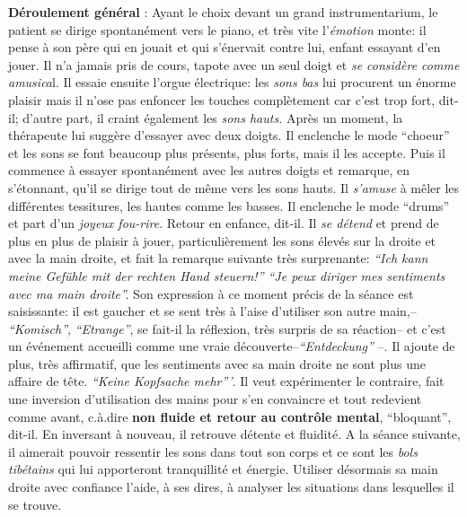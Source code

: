      	 \textbf{Déroulement général} :
    Ayant le choix devant un grand instrumentarium,
            le patient se dirige spontanément vers le piano, et très vite
            l'\textit{émotion} monte: il pense à son père qui en jouait et qui
            s'énervait contre lui, enfant essayant d'en
            jouer. Il n'a jamais pris de cours, tapote avec un seul doigt et \textit{se considère comme
            amusica}l. Il essaie ensuite l'orgue électrique: les \textit{sons bas}
            lui procurent un énorme plaisir mais il n'ose pas enfoncer les touches
            complètement car c'est trop fort, dit-il; d'autre part, il
            craint également les
            \textit{sons hauts.}
            Après un moment, la thérapeute lui suggère d'essayer avec deux doigts.
            Il enclenche le mode ``choeur'' et les sons se font beaucoup
            plus présents, plus forts, mais il les accepte. Puis il commence à essayer spontanément
            avec les autres doigts et remarque,  en s'étonnant, qu'il se
            dirige tout de même vers les sons
            hauts. Il \textit{s'amuse} à mêler les différentes tessitures,
            les hautes comme les basses.
            Il enclenche le mode ``drums'' et part d'un\textit{ joyeux
            fou-rire}. Retour en enfance, dit-il.
            Il \textit{se détend} et prend de plus en plus de plaisir à jouer, particulièrement  les sons élevés
            sur la droite et avec la main droite, et fait
            la remarque suivante très surprenante:
            \textit{``Ich kann meine Gefühle mit der rechten Hand steuern!''
            ``Je peux diriger mes sentiments avec ma main droite''.}
     Son expression à ce moment précis de la séance est saisissante: il
            est gaucher et se sent très à l'aise d'utiliser son autre
            main,-- \textit{``Komisch''},  \textit{``Etrange''}, se fait-il
            la réflexion, très surpris de sa réaction-- et c'est un événement
            accueilli comme une vraie
            découverte--\textit{``Entdeckung''} --.
            Il ajoute de plus, très affirmatif, que les sentiments avec sa main
            droite ne sont plus une affaire de tête. \textit{``Keine
            Kopfsache mehr'''}. Il veut expérimenter le contraire, fait
          une inversion d'utilisation des mains pour s'en convaincre et tout redevient comme
            avant, c.à.dire \textbf{non fluide et retour au contrôle
              mental},
            ``bloquant'', dit-il. En inversant à nouveau, il retrouve
            détente et fluidité.
            A la séance suivante, il aimerait pouvoir ressentir
            les sons dans tout son corps et ce sont les\textit{ bols
              tibétains } qui lui
            apporteront tranquillité et
            énergie. Utiliser désormais sa main
            droite avec confiance l'aide, à ses dires, à analyser les
            situations dans lesquelles il se trouve.


